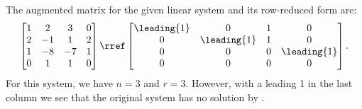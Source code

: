 The augmented matrix for the given linear system and its row-reduced form are:
\begin{align*}
\begin{bmatrix}
1 & 2 & 3 & 0\\
2 & -1 & 1 & 2\\
1 & -8 & -7 & 1\\
0 & 1 & 1 & 0
\end{bmatrix}
\rref
\begin{bmatrix}
\leading{1} & 0 & 1 & 0\\
0 & \leading{1} & 1 & 0\\
0 & 0 & 0 & \leading{1}\\
0 & 0 & 0 & 0
\end{bmatrix}.
\end{align*}
For this system, we have $n = 3$ and $r = 3$.  However, with a leading 1 in the last column we see that the original system has no solution by .

